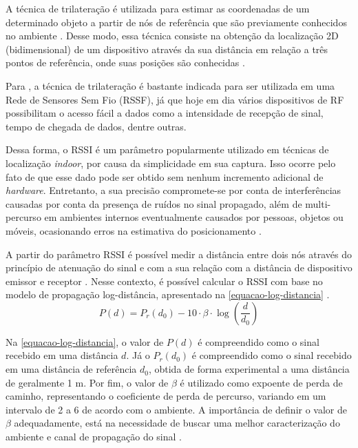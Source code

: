 \documentclass[12pt]{artigoifce}
\begin{document}
A técnica de trilateração é utilizada para estimar as coordenadas de um determinado objeto a partir de nós de referência que são previamente conhecidos no ambiente \cite{oliveira2021}. Desse modo, essa técnica consiste na obtenção da localização 2D (bidimensional) de um dispositivo através da sua distância em relação a três pontos de referência, onde suas posições são conhecidas \cite{sadowski2018}.

Para , a técnica de trilateração é bastante indicada para ser utilizada em uma Rede de Sensores Sem Fio (RSSF), já que hoje em dia vários dispositivos de RF possibilitam o acesso fácil a dados como a intensidade de recepção de sinal, tempo de chegada de dados, dentre outras. 


Dessa forma, o RSSI é um parâmetro popularmente utilizado em técnicas de localização \textit{indoor}, por causa da simplicidade em sua captura. Isso ocorre pelo fato de que esse dado pode ser obtido sem nenhum incremento adicional de \textit{hardware}. Entretanto, a sua precisão compromete-se por conta de interferências causadas por conta da presença de ruídos no sinal propagado, além de multi-percurso em ambientes internos eventualmente causados por pessoas, objetos ou móveis, ocasionando erros na estimativa do posicionamento \cite{tatsch2019}.

A partir do parâmetro RSSI é possível medir a distância entre dois nós através do princípio de atenuação do sinal e com a sua relação com a distância de dispositivo emissor e receptor \cite{mendes2021}. Nesse contexto, é possível calcular o RSSI com base no modelo de propagação log-distância, apresentado na \autoref{equacao-log-distancia} \cite{rappaport2008}. 
\begin{equation}
    \label{equacao-log-distancia}
    P(d) = P_r(d_0) - 10\cdot\beta\cdot\log\left(\frac{d}{d_0}\right)
\end{equation}

Na \autoref{equacao-log-distancia}, o valor de $P(d)$ é compreendido como o sinal recebido em uma distância $d$. Já o $P_r(d_0)$ é compreendido como o sinal recebido em uma distância de referência $d_0$, obtida de forma experimental a uma distância de geralmente 1 m. Por fim, o valor de $\beta$ é utilizado como expoente de perda de caminho, representando o coeficiente de perda de percurso, variando em um intervalo de 2 a 6 de acordo com o ambiente. A importância de definir o valor de $\beta$ adequadamente, está na necessidade de buscar uma melhor caracterização do ambiente e canal de propagação do sinal \cite{mendes2021, rappaport2008}. 
\end{document}
